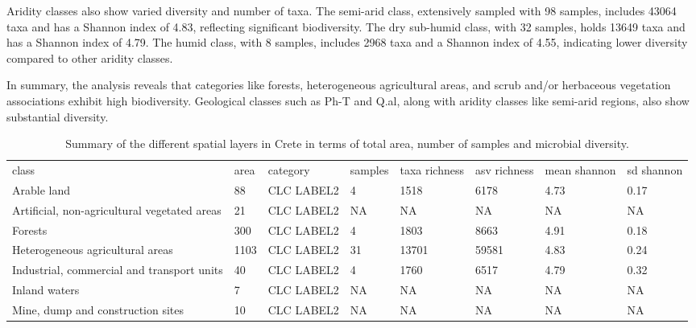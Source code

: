 Aridity classes also show varied diversity and number of taxa. The semi-arid class,
extensively sampled with 98 samples, includes 43064 taxa and has a Shannon index of 4.83,
reflecting significant biodiversity. The dry sub-humid class, with 32 samples, holds
13649 taxa and has a Shannon index of 4.79. The humid class, with 8 samples, includes 2968 taxa and a Shannon index of 4.55, indicating lower diversity compared to other aridity classes.

In summary, the analysis reveals that categories like forests, heterogeneous agricultural areas,
and scrub and/or herbaceous vegetation associations exhibit high biodiversity.
Geological classes such as Ph-T and Q.al, along with aridity classes like
semi-arid regions, also show substantial diversity.

\begin{sidewaystable*}
    \caption{Summary of the different spatial layers in Crete in terms of total area, number of samples and microbial diversity.\label{table:data_cube_summary}}
\begin{tabular*}{\textwidth}{@{\extracolsep{\fill}}llllllll@{\extracolsep{\fill}}}
\tabcolsep=0pt%
class                                           & area & category             & samples & taxa richness & asv richness & mean shannon & sd shannon \\
Arable land                                     & 88   & CLC LABEL2           & 4       & 1518           & 6178          & 4.73          & 0.17        \\
Artificial, non-agricultural vegetated areas    & 21   & CLC LABEL2           & NA      & NA             & NA            & NA            & NA          \\
Forests                                         & 300  & CLC LABEL2           & 4       & 1803           & 8663          & 4.91          & 0.18        \\
Heterogeneous agricultural areas                & 1103 & CLC LABEL2           & 31      & 13701          & 59581         & 4.83          & 0.24        \\
Industrial, commercial and transport units      & 40   & CLC LABEL2           & 4       & 1760           & 6517          & 4.79          & 0.32        \\
Inland waters                                   & 7    & CLC LABEL2           & NA      & NA             & NA            & NA            & NA          \\
Mine, dump and construction sites               & 10   & CLC LABEL2           & NA      & NA             & NA            & NA            & NA          \\

\end{tabular*}
\end{sidewaystable*}

